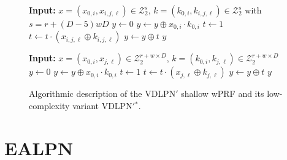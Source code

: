 \documentclass[journal=tosc,submission]{iacrtrans}
\theoremstyle{theorem}
\newcommand\Z{\mathcal{Z}}
\begin{document}
\begin{figure}[ht]
\centering
\begin{minipage}[t]{0.47\textwidth}
\begin{algorithm}[H]
  \caption{\label{alg:vdlpn_variant}The {\sf VDLPN}$'$ wPRF\\Parameters: Integers $r, w, D$}
  \begin{algorithmic}
   \State \textbf{Input:} $x = (x_{0,i}, x_{i,j,\ell}) \in \Z_2^{s}$, $k = (k_{0,i},k_{i,j,\ell}) \in \Z_2^{s}$ with $s=r+(D-5) w D$
    \State $y \gets 0$
      \State $y \gets y \oplus x_{0,i}\cdot k_{0,i}$
    \EndFor
        \State $t \gets 1$
          \State $t \gets t \cdot (x_{i,j,\ell} \oplus k_{i,j,\ell})$
        \EndFor
        \State $y \gets y \oplus t$
      \EndFor
    \EndFor
    \State \Return $y$
  \end{algorithmic}
\end{algorithm}
\end{minipage}
\hfill
\begin{minipage}[t]{0.47\textwidth}
\begin{algorithm}[H]
  \caption{\label{alg:vdlpn_simple_variant}The {{\sf VDLPN}$'$}$^*$ wPRF\\Parameters: Integers $r,w, D$}
  \begin{algorithmic}
    \State \textbf{Input:} $x = (x_{0,i}, x_{j,\ell}) \in \Z_2^{r+w\times D}$,  $k = (k_{0,i}, k_{j,\ell}) \in \Z_2^{r+w\times D}$
    \State $y \gets 0$
      \State $y \gets y \oplus x_{0,i}\cdot k_{0,i}$
    \EndFor
        \State $t \gets 1$
          \State $t \gets t \cdot (x_{j,\ell} \oplus k_{j,\ell})$
        \EndFor
        \State $y \gets y \oplus t$
      \EndFor
    \EndFor
    \State \Return $y$
  \end{algorithmic}
\end{algorithm}
\end{minipage}
\caption{Algorithmic description of the {\sf VDLPN}$'$ shallow wPRF and its low-complexity variant {{\sf VDLPN}$'$}$^*$.}
\end{figure}











\section{EALPN}
\label{sec:ealpn}
\end{document}
